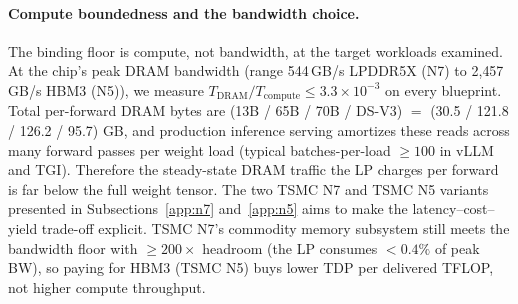 \paragraph{Compute boundedness and the bandwidth choice.}
The binding floor is compute, not bandwidth, at the target workloads examined.
At the chip's peak DRAM bandwidth (range 544\,GB/s LPDDR5X (N7) to 2{,}457\,GB/s HBM3 (N5)), we measure $T_{\text{DRAM}}/T_{\text{compute}} \le 3.3 \times 10^{-3}$ on every blueprint.
Total per-forward DRAM bytes are (13B / 65B / 70B / DS-V3) $=$ (30.5 / 121.8 / 126.2 / 95.7) GB, and production inference serving amortizes these reads across many forward passes per weight load (typical batches-per-load $\ge 100$ in vLLM and TGI).
Therefore the steady-state DRAM traffic the LP charges per forward is far below the full weight tensor.
The two TSMC N7 and TSMC N5 variants presented in Subsections~\ref{app:n7} and~\ref{app:n5} aims to make the latency--cost--yield trade-off explicit.
TSMC N7's commodity memory subsystem still meets the bandwidth floor with $\ge 200\times$ headroom (the LP consumes $< 0.4\%$ of peak BW), so paying for HBM3 (TSMC N5) buys lower TDP per delivered TFLOP, not higher compute throughput. 



\clearpage

